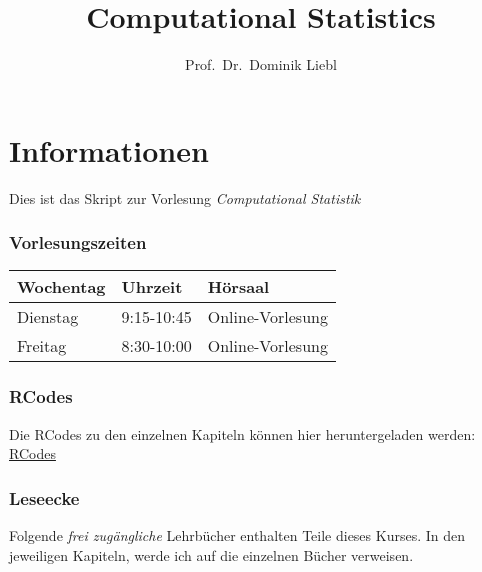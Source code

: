 \documentclass[
  ngerman,
]{book}
\title{Computational Statistics}
\author{Prof.~Dr.~Dominik Liebl}
\date{}
\begin{document}
\maketitle

{
\setcounter{tocdepth}{1}
\tableofcontents
}
\hypertarget{informationen}{%
\chapter*{Informationen}\label{informationen}}

Dies ist das Skript zur Vorlesung \emph{Computational Statistik}

\hypertarget{vorlesungszeiten}{%
\subsection*{Vorlesungszeiten}\label{vorlesungszeiten}}

\begin{table}[H]
\centering
\begin{tabular}[t]{l|l|l}
\hline
Wochentag & Uhrzeit & Hörsaal\\
\hline
Dienstag & 9:15-10:45 & Online-Vorlesung\\
\hline
Freitag & 8:30-10:00 & Online-Vorlesung\\
\hline
\end{tabular}
\end{table}

\hypertarget{rcodes}{%
\subsection*{RCodes}\label{rcodes}}

Die RCodes zu den einzelnen Kapiteln können hier heruntergeladen werden: \href{https://github.com/lidom/Computational_Statistics_Script/tree/main/RCodes}{RCodes}

\hypertarget{leseecke}{%
\subsection*{Leseecke}\label{leseecke}}

Folgende \emph{frei zugängliche} Lehrbücher enthalten Teile dieses Kurses. In den jeweiligen Kapiteln, werde ich auf die einzelnen Bücher verweisen.
\end{document}
